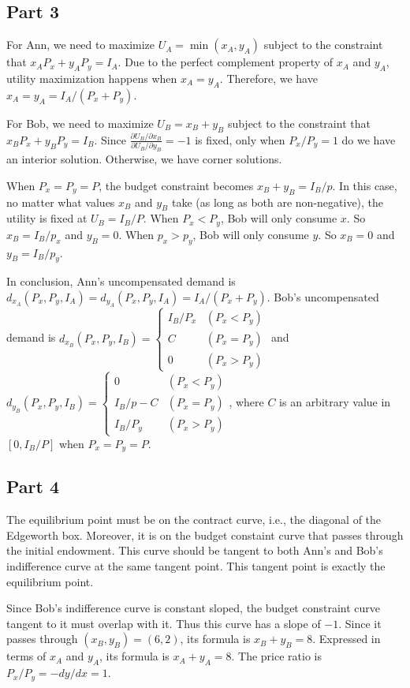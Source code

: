 \documentclass{article}
\begin{document}
\subsection{Part 3}
For Ann, we need to maximize $U_A=\min(x_A,y_A)$ subject to the constraint that $x_AP_x+y_AP_y=I_A$. Due to the perfect complement property of $x_A$ and $y_A$, utility maximization happens when $x_A=y_A$. Therefore, we have $x_A=y_A=I_A/(P_x+P_y)$.

For Bob, we need to maximize $U_B=x_B+y_B$ subject to the constraint that $x_BP_x+y_BP_y=I_B$. Since $\frac{\partial U_B/\partial x_B}{\partial U_B/\partial y_B}=-1$ is fixed, only when $P_x/P_y=1$ do we have an interior solution. Otherwise, we have corner solutions.

When $P_x=P_y=P$, the budget constraint becomes $x_B+y_B=I_B/p$. In this case, no matter what values $x_B$ and $y_B$ take (as long as both are non-negative), the utility is fixed at $U_B=I_B/P$. When $P_x<P_y$, Bob will only consume $x$. So $x_B=I_B/p_x$ and $y_B=0$. When $p_x>p_y$, Bob will only consume $y$. So $x_B=0$ and $y_B=I_B/p_y$.

In conclusion, Ann's uncompensated demand is $d_{x_A}(P_x,P_y,I_A)=d_{y_A}(P_x,P_y,I_A)=I_A/(P_x+P_y)$. Bob's uncompensated demand is $d_{x_B}(P_x,P_y,I_B)=\displaystyle\left\{\begin{array}{ll}I_B/P_x&(P_x<P_y)\\C&(P_x=P_y)\\0&(P_x>P_y)\end{array}\right.$ and $d_{y_B}(P_x,P_y,I_B)=\displaystyle\left\{\begin{array}{ll}0&(P_x<P_y)\\I_B/p-C&(P_x=P_y)\\I_B/P_y&(P_x>P_y)\end{array}\right.$, where $C$ is an arbitrary value in $[0,I_B/P]$ when $P_x=P_y=P$.

\subsection{Part 4}
The equilibrium point must be on the contract curve, i.e., the diagonal of the Edgeworth box. Moreover, it is on the budget constaint curve that passes through the initial endowment. This curve should be tangent to both Ann's and Bob's indifference curve at the same tangent point. This tangent point is exactly the equilibrium point.

Since Bob's indifference curve is constant sloped, the budget constraint curve tangent to it must overlap with it. Thus this curve has a slope of $-1$. Since it passes through $(x_B,y_B)=(6,2)$, its formula is $x_B+y_B=8$. Expressed in terms of $x_A$ and $y_A$, its formula is $x_A+y_A=8$. The price ratio is $P_x/P_y=-dy/dx=1$.
\end{document}
